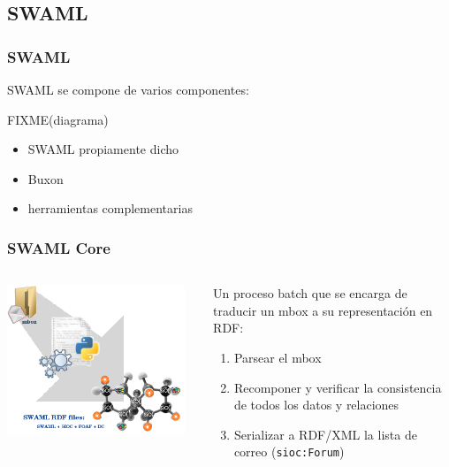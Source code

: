 \documentclass[spanish,notes=hide]{beamer}
\begin{document}
\subsection{SWAML}
\frame
{
  \frametitle{SWAML}

  SWAML se compone de varios componentes:

  FIXME(diagrama)

  \begin{itemize}
   \item SWAML propiamente dicho
   \item Buxon
   \item herramientas complementarias
  \end{itemize}
}
\frame
{
  \frametitle{SWAML Core}
  \begin{columns}
   \begin{column}{0.5\textwidth}
	\includegraphics[width=0.95\textwidth]{images/swaml.png}
   \end{column}
   \begin{column}{0.5\textwidth}
	Un proceso batch que se encarga de traducir un mbox a su representación en RDF:
	\begin{enumerate}
	 \item Parsear el mbox
	 \item Recomponer y verificar la consistencia de todos los datos y relaciones
	 \item Serializar a RDF/XML la lista de correo (\texttt{sioc:Forum})
	\end{enumerate}
   \end{column}
  \end{columns}
}
\end{document}
